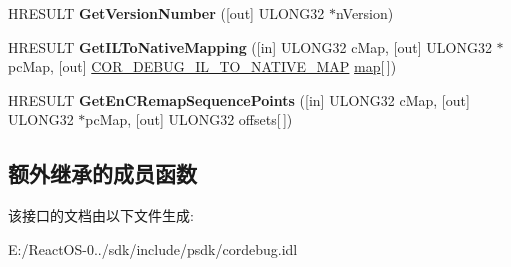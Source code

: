 \begin{DoxyCompactItemize}
H\+R\+E\+S\+U\+LT {\bfseries Get\+Version\+Number} (\mbox{[}out\mbox{]} U\+L\+O\+N\+G32 $\ast$n\+Version)
\item 
\mbox{\label{interface_i_cor_debug_code_aa5a0634172002fafcbe1e3fa12af7e09}} 
H\+R\+E\+S\+U\+LT {\bfseries Get\+I\+L\+To\+Native\+Mapping} (\mbox{[}in\mbox{]} U\+L\+O\+N\+G32 c\+Map, \mbox{[}out\mbox{]} U\+L\+O\+N\+G32 $\ast$pc\+Map, \mbox{[}out\mbox{]} \hyperlink{struct_c_o_r___d_e_b_u_g___i_l___t_o___n_a_t_i_v_e___m_a_p}{C\+O\+R\+\_\+\+D\+E\+B\+U\+G\+\_\+\+I\+L\+\_\+\+T\+O\+\_\+\+N\+A\+T\+I\+V\+E\+\_\+\+M\+AP} \hyperlink{classmap}{map}\mbox{[}$\,$\mbox{]})
\item 
\mbox{\label{interface_i_cor_debug_code_a0c7bbd410935fea343658df1ad70c6ef}} 
H\+R\+E\+S\+U\+LT {\bfseries Get\+En\+C\+Remap\+Sequence\+Points} (\mbox{[}in\mbox{]} U\+L\+O\+N\+G32 c\+Map, \mbox{[}out\mbox{]} U\+L\+O\+N\+G32 $\ast$pc\+Map, \mbox{[}out\mbox{]} U\+L\+O\+N\+G32 offsets\mbox{[}$\,$\mbox{]})
\end{DoxyCompactItemize}
\subsection*{额外继承的成员函数}


该接口的文档由以下文件生成\+:\begin{DoxyCompactItemize}
\item 
E\+:/\+React\+O\+S-\/0../sdk/include/psdk/cordebug.\+idl\end{DoxyCompactItemize}
